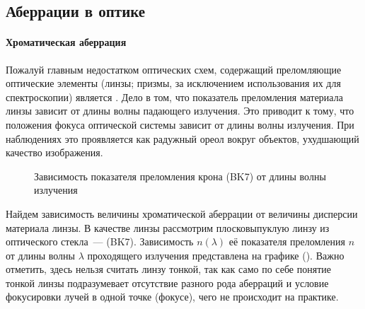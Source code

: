 \subsection{Аберрации в оптике}
\label{sec:aberrations}
\paragraph{Хроматическая аберрация}
Пожалуй главным недостатком оптических схем, содержащий преломляющие оптические элементы (линзы; призмы, за исключением использования их для спектроскопии) является . Дело в том, что показатель преломления материала линзы зависит от длины волны падающего излучения. Это приводит к тому, что положения фокуса оптической системы зависит от длины волны излучения. При наблюдениях это проявляется как радужный ореол вокруг объектов, ухудшающий качество изображения.

\begin{figure}
    \centering
    \vspace{-1pc}
    \caption{Зависимость показателя преломления крона (BK7) от длины волны излучения}
    \label{pic:crown-dispersion}
\end{figure}
Найдем зависимость величины хроматической аберрации от величины дисперсии материала линзы. В качестве линзы рассмотрим плосковыпуклую линзу из оптического стекла~---  (BK7). Зависимость $n(\lambda)$ её показателя преломления $n$ от длины волны $\lambda$ проходящего излучения представлена на графике (). Важно отметить, здесь нельзя считать линзу тонкой, так как само по себе понятие тонкой линзы подразумевает отсутствие разного рода аберраций и условие фокусировки лучей в одной точке (фокусе), чего не происходит на практике.

